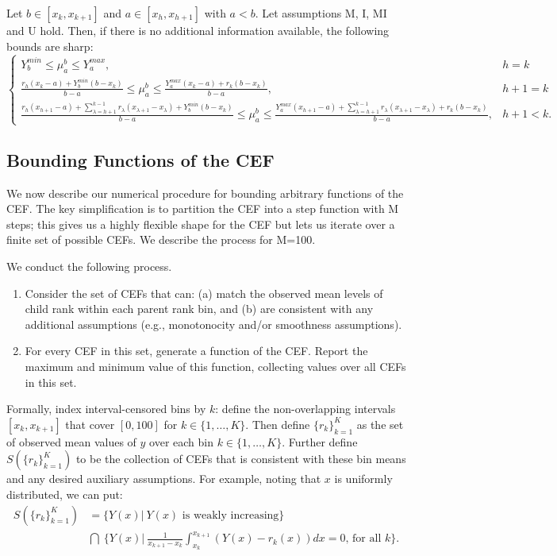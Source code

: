 \begin{nono-prop} 
  Let $b \in [x_k, x_{k+1}]$ and $a \in [x_h, x_{h+1}]$ with $a<b$. Let
  assumptions M, I, MI \cite{manski2002} and U hold. Then, if there is no
  additional information available, the
  following bounds are sharp: 
  \label{eq:bound_mu} 
$$ 
  \begin{cases} 
     Y_b^{min} \leq \mu_a^b \leq Y_a^{max}, & h = k \\
    \frac{r_h (x_k - a) + Y_b^{min}(b - x_k)}{b-a} \leq
    \mu_a^b \leq \frac{Y_a^{max} (x_k - a) + r_k
      (b-x_k)}{b-a}, & h +
    1 = k \\
    \frac{r_h (x_{h+1} - a) + \sum_{\lambda = h+1}^{k-1} r_{\lambda}
      (x_{\lambda+1} - x_{\lambda}) + Y_b^{min}(b - x_k)}{b-a} \leq
    \mu_a^b 
    \leq \frac{Y_a^{max} (x_{h+1} - a) + \sum_{\lambda = h+1}^{k-1} r_{\lambda}
      (x_{\lambda+1} - x_{\lambda}) + r_k (b-x_k)}{b-a}, & h +
    1 < k. 
  \end{cases} 
$$ 
\end{nono-prop} 

\subsection{Bounding Functions of the CEF} 
\label{app:num_fn} 

We now describe our numerical procedure for bounding arbitrary functions of the
CEF. The key simplification is to partition the CEF into a step function with M steps; this gives us a highly flexible shape for the CEF but lets us iterate over a finite set of possible CEFs. We describe the process for M=100.

We conduct the following process. 
\begin{enumerate}
\item Consider the set of CEFs that can: (a) match the observed mean
  levels of child rank within each parent rank bin, and (b) are
  consistent with any additional assumptions (e.g., monotonocity and/or
  smoothness assumptions). 
\item For every CEF in this set, generate a function of the
  CEF. Report the maximum and minimum value of this function,
  collecting values over all CEFs in this set. 
\end{enumerate}

Formally, index interval-censored bins by $k$: define the non-overlapping intervals
$[x_k, x_{k+1}]$ that cover $[0,100]$ for $k \in \{1, \dots,
K\}$. Then define $\{r_k\}_{k=1}^K$ as the set of observed mean
values of $y$ over each bin $k \in \{ 1, \dots, K \}$. Further define
$S(\{r_k\}_{k=1}^K)$ to be the collection of CEFs that is consistent
with these bin means and any desired auxiliary assumptions. For
example, noting that $x$ is uniformly distributed, we can put:
\begin{align} 
S\left(\{r_k\}_{k=1}^K\right) &= \Big\{ Y(x) | \ Y(x) \text{ is weakly
  increasing} \Big\} \nonumber \\ 
& \bigcap \ \Big\{ Y(x) \Big| \ \frac{1}{x_{k+1} - x_k}
  \int_{x_k}^{x_{k+1}} \left( Y(x) - r_k(x) \right) dx = 0
  \text{, for all } k \Big\} .
\end{align}


